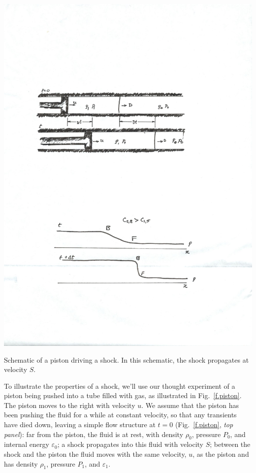 \begin{marginfigure}
\includegraphics[width=\textwidth]{piston}
\caption[Schematic of a piston driving a shock.]{Schematic of a piston driving a shock.  In this schematic, the shock propagates at velocity $S$.}
\label{f.piston}
\end{marginfigure}

To illustrate the properties of a shock, we'll use our thought experiment of a piston being pushed into a tube filled with gas, as illustrated in Fig.~\ref{f.piston}.  The piston moves to the right with velocity $u$.  We assume that the piston has been pushing the fluid for a while at constant velocity, so that any transients have died down, leaving a simple flow structure at $t=0$ (Fig.~\ref{f.piston}, \emph{top panel}): far from the piston, the fluid is at rest, with density $\rho_{0}$, pressure $P_{0}$, and internal energy $\varepsilon_{0}$; a shock propagates into this fluid with velocity $S$; between the shock and the piston the fluid moves with the same velocity, $u$, as the piston and has density $\rho_{1}$, pressure $P_{1}$, and $\varepsilon_{1}$.

